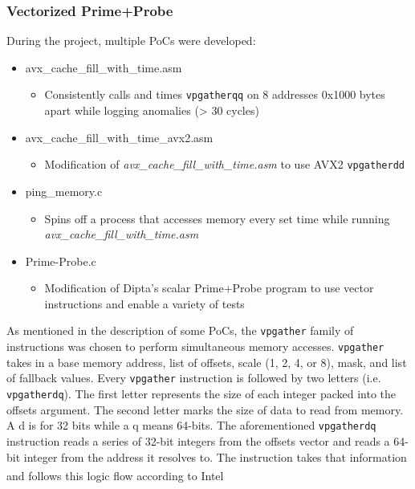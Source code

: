 \documentclass[article]{IEEEtran}
\begin{document}
\subsubsection{Vectorized Prime+Probe}
During the project, multiple PoCs were developed:
\begin{itemize}
    \item avx\_cache\_fill\_with\_time.asm
    \begin{itemize}
        \item Consistently calls and times \texttt{vpgatherqq} on 8 addresses 0x1000 bytes apart while logging anomalies (> 30 cycles)
    \end{itemize}
    \item avx\_cache\_fill\_with\_time\_avx2.asm
    \begin{itemize}
        \item Modification of \emph{avx\_cache\_fill\_with\_time.asm} to use AVX2 \texttt{vpgatherdd}
    \end{itemize}
    \item ping\_memory.c
    \begin{itemize}
        \item Spins off a process that accesses memory every set time while running \emph{avx\_cache\_fill\_with\_time.asm}
    \end{itemize}
    \item Prime-Probe.c
    \begin{itemize}
        \item Modification of Dipta's scalar Prime+Probe program to use vector instructions and enable a variety of tests
    \end{itemize}
\end{itemize}

As mentioned in the description of some PoCs, the \texttt{vpgather} family of instructions was chosen to perform simultaneous memory accesses. \texttt{vpgather} takes in a base memory address, list of offsets, scale (1, 2, 4, or 8), mask, and list of fallback values. Every \texttt{vpgather} instruction is followed by two letters (i.e. \texttt{vpgatherdq}). The first letter represents the size of each integer packed into the offsets argument. The second letter marks the size of data to read from memory. A d is for 32 bits while a q means 64-bits. The aforementioned \texttt{vpgatherdq} instruction reads a series of 32-bit integers from the offsets vector and reads a 64-bit integer from the address it resolves to. The instruction takes that information and follows this logic flow according to Intel\textsuperscript{\tiny\textregistered}\cite{intrinsics}
\end{document}
